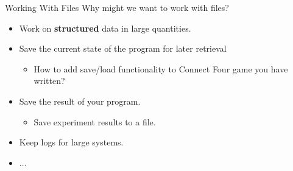     \begin{frame}{Working With Files}
        \LARGE
        Why might we want to work with files?
        \begin{itemize}
            \pause
            \item Work on \textbf{structured} data in large quantities.
            \pause
            \item Save the current state of the program for later retrieval
            \begin{itemize}
                \Large
                \pause
                \item How to add save/load functionality to Connect Four game you have written?
            \end{itemize}
            \item Save the result of your program.
            \begin{itemize}
                \Large
                \pause
                \item Save experiment results to a file.
            \end{itemize} 
            \pause
            \item Keep logs for large systems.
            \pause
            \item $\dots$
        \end{itemize}
    \end{frame}

